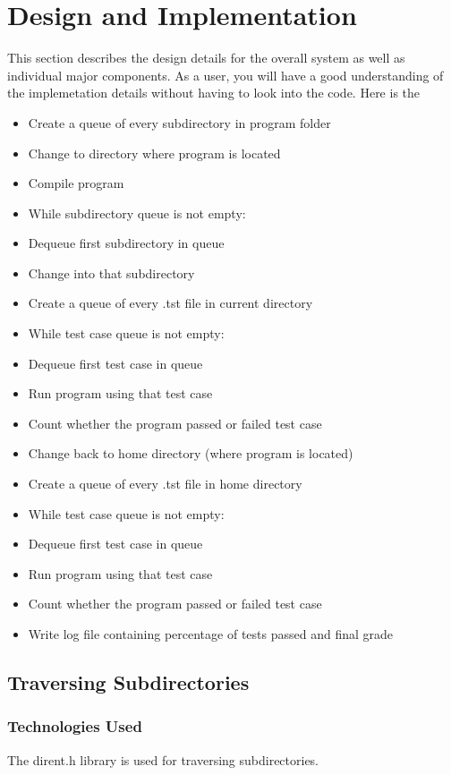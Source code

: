 \chapter{Design  and Implementation}
 This section describes the design details for the overall system as well as individual major components. As a user, you will have a good understanding of the implemetation details without having to look into the code. Here is the  


\begin{itemize}
  \item Create a queue of every subdirectory in program folder
  \item Change to directory where program is located
  \item Compile program
  \item While subdirectory queue is not empty:
  \item Dequeue first subdirectory in queue
  \item Change into that subdirectory
  \item Create a queue of every .tst file in current directory
  \item While test case queue is not empty:
  \item Dequeue first test case in queue
  \item Run program using that test case
  \item Count whether the program passed or failed test case
  \item Change back to home directory (where program is located)
  \item Create a queue of every .tst file in home directory
  \item While test case queue is not empty:
  \item Dequeue first test case in queue
  \item Run program using that test case
  \item Count whether the program passed or failed test case
  \item Write log file containing percentage of tests passed and final grade
\end{itemize}


\section{Traversing Subdirectories }

\subsection{Technologies  Used}
The dirent.h library is used for traversing subdirectories.

